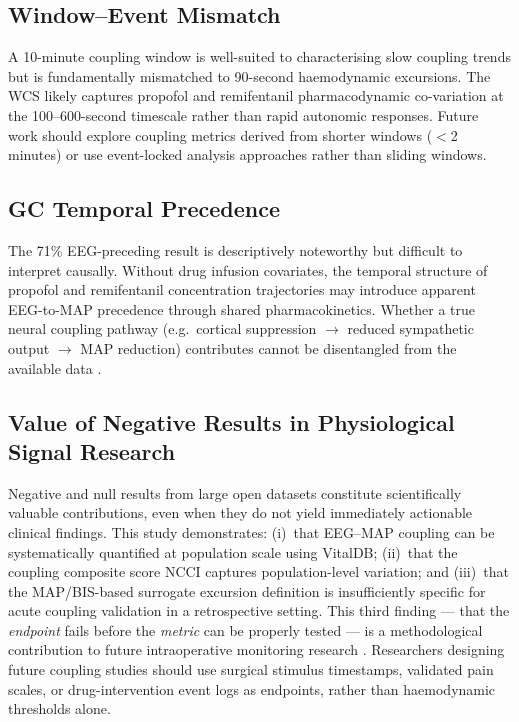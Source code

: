 \documentclass[fleqn,10pt,lineno]{wlpeerj}
\begin{document}
\subsection{Window--Event Mismatch}

A 10-minute coupling window is well-suited to characterising slow coupling trends but is
fundamentally mismatched to 90-second haemodynamic excursions. The WCS likely captures propofol
and remifentanil pharmacodynamic co-variation at the 100--600-second timescale
\citep{struys2000} rather than rapid autonomic responses. Future work should explore coupling
metrics derived from shorter windows ($<$2 minutes) or use event-locked analysis approaches
rather than sliding windows.

\subsection{GC Temporal Precedence}

The 71\% EEG-preceding result is descriptively noteworthy but difficult to interpret causally.
Without drug infusion covariates, the temporal structure of propofol and remifentanil
concentration trajectories may introduce apparent EEG-to-MAP precedence through shared
pharmacokinetics. Whether a true neural coupling pathway (e.g.\ cortical suppression $\to$
reduced sympathetic output $\to$ MAP reduction) contributes cannot be disentangled from the
available data \citep{sessler2012}.

\subsection{Value of Negative Results in Physiological Signal Research}

Negative and null results from large open datasets constitute scientifically valuable
contributions, even when they do not yield immediately actionable clinical findings. This study
demonstrates: (i)~that EEG--MAP coupling can be systematically quantified at population scale
using VitalDB; (ii)~that the coupling composite score NCCI captures population-level variation;
and (iii)~that the MAP/BIS-based surrogate excursion definition is insufficiently specific for
acute coupling validation in a retrospective setting. This third finding --- that the
\textit{endpoint} fails before the \textit{metric} can be properly tested --- is a
methodological contribution to future intraoperative monitoring research
\citep{sessler2012,struys2000}. Researchers designing future coupling studies should use
surgical stimulus timestamps, validated pain scales, or drug-intervention event logs as
endpoints, rather than haemodynamic thresholds alone.
\end{document}
